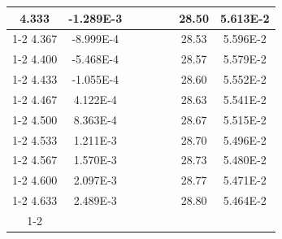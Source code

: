 \documentclass[article,12pt]{elsarticle}
\begin{document}
\begin{longtable}[c]{|c|c|cccccc}
4.333    & -1.289E-3 &                       &                              &                            & \multicolumn{1}{c|}{} & \multicolumn{1}{c|}{28.50}   & \multicolumn{1}{c|}{5.613E-2} \\ \cline{1-2} \cline{7-8} 
4.367    & -8.999E-4 &                       &                              &                            & \multicolumn{1}{c|}{} & \multicolumn{1}{c|}{28.53}   & \multicolumn{1}{c|}{5.596E-2} \\ \cline{1-2} \cline{7-8} 
4.400    & -5.468E-4 &                       &                              &                            & \multicolumn{1}{c|}{} & \multicolumn{1}{c|}{28.57}   & \multicolumn{1}{c|}{5.579E-2} \\ \cline{1-2} \cline{7-8} 
4.433    & -1.055E-4 &                       &                              &                            & \multicolumn{1}{c|}{} & \multicolumn{1}{c|}{28.60}   & \multicolumn{1}{c|}{5.552E-2} \\ \cline{1-2} \cline{7-8} 
4.467    & 4.122E-4  &                       &                              &                            & \multicolumn{1}{c|}{} & \multicolumn{1}{c|}{28.63}   & \multicolumn{1}{c|}{5.541E-2} \\ \cline{1-2} \cline{7-8} 
4.500    & 8.363E-4  &                       &                              &                            & \multicolumn{1}{c|}{} & \multicolumn{1}{c|}{28.67}   & \multicolumn{1}{c|}{5.515E-2} \\ \cline{1-2} \cline{7-8} 
4.533    & 1.211E-3  &                       &                              &                            & \multicolumn{1}{c|}{} & \multicolumn{1}{c|}{28.70}   & \multicolumn{1}{c|}{5.496E-2} \\ \cline{1-2} \cline{7-8} 
4.567    & 1.570E-3  &                       &                              &                            & \multicolumn{1}{c|}{} & \multicolumn{1}{c|}{28.73}   & \multicolumn{1}{c|}{5.480E-2} \\ \cline{1-2} \cline{7-8} 
4.600    & 2.097E-3  &                       &                              &                            & \multicolumn{1}{c|}{} & \multicolumn{1}{c|}{28.77}   & \multicolumn{1}{c|}{5.471E-2} \\ \cline{1-2} \cline{7-8} 
4.633    & 2.489E-3  &                       &                              &                            & \multicolumn{1}{c|}{} & \multicolumn{1}{c|}{28.80}   & \multicolumn{1}{c|}{5.464E-2} \\ \cline{1-2} \cline{7-8} 

\end{longtable}
\end{document}
